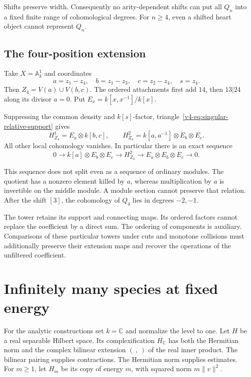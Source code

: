 Shifts preserve width.
Consequently no arity-dependent shifts can put
all \(Q_n\) into a fixed finite range
of cohomological degrees.
For \(n\geq4\), even a shifted heart
object cannot represent \(Q_n\).

\subsection{The four-position extension}

Take \(X=\mathbb A^1_k\) and coordinates
\[
       a=z_1-z_4,\quad b=z_1-z_3,\quad
       c=z_2-z_4,\quad s=z_4.
\]
Then \(Z_4=V(a)\cup V(b,c)\).
The ordered attachments first add \(14\),
then \(13|24\) along its divisor \(a=0\).
Put \(E_x=k[x,x^{-1}]/k[x]\).

Suppressing the common density and \(k[s]\)-factor,
triangle~\eqref{v4-eq:singular-relative-support} gives
\[
 H^1_{Z_4}=E_a\otimes k[b,c],\qquad
 H^2_{Z_4}=k[a,a^{-1}]\otimes E_b\otimes E_c.
\]
All other local cohomology vanishes.
In particular there is an exact sequence
\begin{equation}\label{v4-eq:singular-four-extension}
 0\longrightarrow k[a]\otimes E_b\otimes E_c
 \longrightarrow H^2_{Z_4}
 \longrightarrow E_a\otimes E_b\otimes E_c
 \longrightarrow0.
\end{equation}

This sequence does not split even as
a sequence of ordinary modules.
The quotient has a nonzero element killed
by \(a\), whereas multiplication by \(a\)
is invertible on the middle module.
A module section cannot preserve that relation.
After the shift \([3]\), the cohomology
of \(Q_4\) lies in degrees \(-2,-1\).

The tower retains its support and connecting
maps. Its ordered factors cannot replace
the coefficient by a direct sum.
The ordering of components is auxiliary.
Comparisons of these particular towers under
cuts and monotone collisions must additionally
preserve their extension maps and recover
the operations of the unfiltered coefficient.

\section{Infinitely many species at fixed energy}
\label{v4-sec:singular-hilbert-fields}

For the analytic constructions set \(k=\mathbb C\)
and normalize the level to one. Let \(H\) be a real
separable Hilbert space. Its complexification
\(H_{\mathbb C}\) has both the Hermitian norm and
the complex bilinear extension \((\ ,\ )\) of the
real inner product. The bilinear pairing supplies
contractions. The Hermitian norm supplies estimates.
For \(m\geq1\), let \(H_m\) be its copy of energy
\(m\), with squared norm \(m\|v\|^2\).

